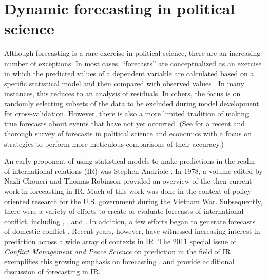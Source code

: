 \section{Dynamic forecasting in political science}
Although forecasting is a rare exercise in political science, there
are an increasing number of exceptions.  In most cases, ``forecasts''
are conceptualized as an exercise in which the predicted values of a
dependent variable are calculated based on a specific statistical
model and then compared with observed values
\citep[e.g.,][]{Hildebrand:etal:1976}. In many instances, this reduces
to an analysis of residuals.  In others, the focus is on randomly
selecting subsets of the data to be excluded during model development
for cross-validation.  However, there is also a more limited tradition
of making true forecasts about events that have not yet occurred.
(See \citet{brandt:freeman:schrodt:2011} for a recent and thorough
survey of forecasts in political science and economics with a focus on
strategies to perform more meticulous comparisons of their accuracy.)


An early proponent of using statistical models to make predictions in
the realm of international relations (IR) was Stephen Andriole
\citep{Andriole:Young:1977}. In 1978, a volume edited by Nazli Choucri
and Thomas Robinson \nocite{Choucri:Robinson:1978} provided an
overview of the then current work in forecasting in IR.  Much of this
work was done in the context of policy-oriented research for the
U.S. government during the Vietnam War.  Subsequently, there were a
variety of efforts to create or evaluate forecasts of international
conflict, including \citet{Freeman:Job:1979},
\citet{Singer:Wallace:1979}, and \citet{Vincent:1980}.  In addition, a
few efforts began to generate forecasts of domestic conflict
\citep[e.g.,][]{Gurr:Lichbach:1986}.  Recent years, however, have
witnessed increasing interest in prediction across a wide array of
contexts in IR.  The 2011 special issue of \emph{Conflict
  Management and Peace Science} on prediction in the field of IR
exemplifies this growing emphasis on forecasting
\citep[c.f.,][]{Schneider_etal_2011, Mesquita_2011,
  Brandt_etal_2011}. 
and
provide additional discussion of forecasting in IR.

